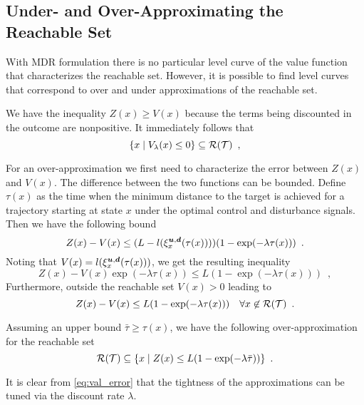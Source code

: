 \subsection{Under- and Over-Approximating the Reachable Set}
With MDR formulation there is no particular level curve of the value function that characterizes the reachable set. However, it is possible to find level curves that correspond to over and under approximations of the reachable set. 

We have the inequality $Z(x) \geq V(x)$ because the terms being discounted in the outcome are nonpositive. It immediately follows that
%
\begin{equation} \label{eq:reach_set}
\{x \mid V_{\lambda}(x) \le 0\} \subseteq \mathcal{R}(\mathcal{T}) \enspace,
\end{equation}  

For an over-approximation we first need to characterize the error between $Z(x)$ and $V(x)$. The difference between the two functions can be bounded. Define $\tau(x)$ as the time when the minimum distance to the target is achieved for a trajectory starting at state $x$ under the optimal control and disturbance signals. Then we have the following bound
%
\begin{equation}
Z(x) - V(x)  \leq (L - l(\xi_{x}^{\bm{u},\bm{d}}(\tau(x))))( 1 -  \exp(-\lambda \tau(x)))
\enspace.
\end{equation}%
\noindent Noting that $V(x)=l(\xi_{x}^{\bm{u},\bm{d}}(\tau(x)))$, we get the resulting inequality
%
\begin{equation} \label{eq:val_error}
Z(x) -  V(x) \exp(-\lambda \tau(x)) \leq L( 1 -  \exp(-\lambda \tau(x))) \enspace,
\end{equation}%
\noindent Furthermore, outside the reachable set $V(x)>0$ leading to
%
\begin{equation}
Z(x) -  V(x)  \leq L( 1 -  \exp(-\lambda \tau(x))) \quad \forall x \not\in \mathcal{R}(\mathcal{T}) \enspace.
\end{equation}

Assuming an upper bound  ${\bar{\tau} \geq \tau(x)}$, we have the following over-approximation for the reachable set
%
\begin{equation} \label{eq:reach_set}
\mathcal{R}(\mathcal{T}) \subseteq  \{x \mid Z(x) \le L( 1 -  \exp(-\lambda \bar{\tau})) \} \enspace.
\end{equation} 

It is clear from \eqref{eq:val_error} that the tightness of the approximations can be tuned via the discount rate $\lambda$.

